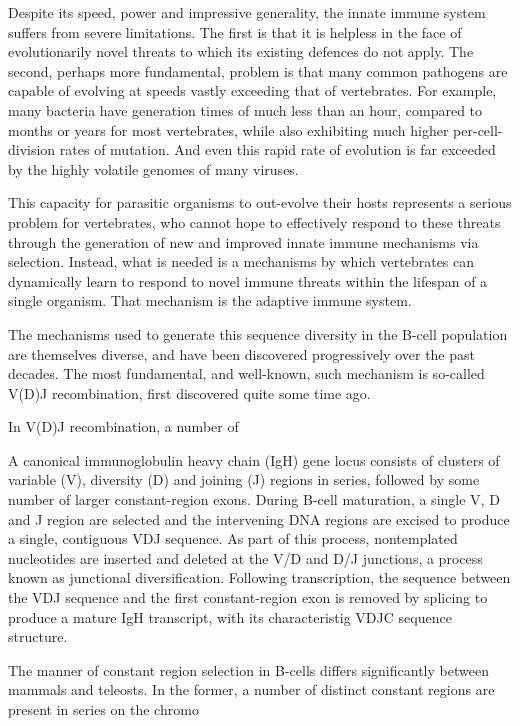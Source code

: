 Despite its speed, power and impressive generality, the innate immune system suffers from severe limitations. The first is that it is helpless in the face of evolutionarily novel threats to which its existing defences do not apply. The second, perhaps more fundamental, problem is that many common pathogens are capable of evolving at speeds vastly exceeding that of vertebrates. For example, many bacteria have generation times of much less than an hour, compared to months or years for most vertebrates, while also exhibiting much higher per-cell-division rates of mutation. And even this rapid rate of evolution is far exceeded by the highly volatile genomes of many viruses.

This capacity for parasitic organisms to out-evolve their hosts represents a serious problem for vertebrates, who cannot hope to effectively respond to these threats through the generation of new and improved innate immune mechanisms via selection. Instead, what is needed is a mechanisms by which vertebrates can dynamically learn to respond to novel immune threats within the lifespan of a single organism. That mechanism is the adaptive immune system.


The mechanisms used to generate this sequence diversity in the B-cell population are themselves diverse, and have been discovered progressively over the past decades. The most fundamental, and well-known, such mechanism is so-called V(D)J recombination, first discovered quite some time ago. %

In V(D)J recombination, a number of

A canonical immunoglobulin heavy chain (IgH) gene locus consists of clusters of variable (V), diversity (D) and joining (J) regions in series, followed by some number of larger constant-region exons. During B-cell maturation, a single V, D and J region are selected and the intervening DNA regions are excised to produce a single, contiguous VDJ sequence. As part of this process, nontemplated nucleotides are inserted and deleted at the V/D and D/J junctions, a process known as junctional diversification. Following transcription, the sequence between the VDJ sequence and the first constant-region exon is removed by splicing to produce a mature IgH transcript, with its characteristig VDJC sequence structure.

The manner of constant region selection in B-cells differs significantly between mammals and teleosts. In the former, a number of distinct constant regions are present in series on the chromo

